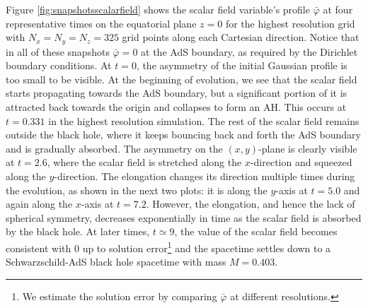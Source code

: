 \documentclass[a4paper,11pt]{article}
\numberwithin{equation}{section}
\begin{document}
Figure \ref{fig:snapshotsscalarfield} shows  the scalar field variable's profile $\bar{\varphi}$ at four representative times on the equatorial plane $z=0$ for the highest resolution grid with $N_x=N_y=N_z=325$ grid points along each Cartesian direction. Notice that in all of these snapshots $\bar{\varphi}=0$ at the AdS boundary, as required by the Dirichlet boundary conditions. At $t=0$, the asymmetry of the initial Gaussian profile is too small to be visible. At the beginning of evolution, we see that the scalar field starts propagating towards the AdS boundary, but
a significant portion of it is attracted back towards the origin and collapses to form an AH.  This occurs at $t=0.331$ in the highest resolution simulation. The rest of the scalar field remains outside the black hole, where it keeps bouncing back and forth the AdS boundary and is gradually absorbed.
The asymmetry on the $(x,y)$-plane is clearly visible at $t=2.6$, where the scalar field is stretched along the $x$-direction and squeezed along the $y$-direction. The elongation changes its direction multiple times during the evolution, as shown in the next two plots: it is along the $y$-axis at $t=5.0$ and again along the $x$-axis at $t=7.2$.  However, the elongation, and hence the lack of spherical symmetry,  decreases exponentially in time as the scalar field is absorbed by the black hole. 
At later times, $t\simeq 9$, the value of the scalar field becomes consistent with 0 up to solution error\footnote{We estimate the solution error  by comparing $\bar{\varphi}$ at different resolutions.} and the spacetime settles down to a Schwarzschild-AdS black hole spacetime with mass $M=0.403$.
\end{document}

